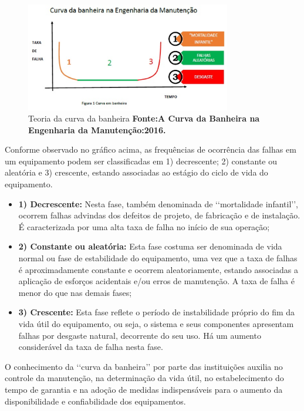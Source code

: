 \graphicspath{{figuras/}}
\begin{figure}[H]
\centering
\includegraphics[width=0.8\textwidth]{curva_da_banheira.eps}
\caption{Teoria da curva da banheira \textbf{Fonte:A Curva da Banheira na Engenharia da Manutenção:2016.}}
\label{Curva da banheira}
\end{figure}

Conforme observado no gráfico acima, as frequências de ocorrência das falhas em um equipamento podem ser classificadas em 1) decrescente; 2) constante ou aleatória e 3) crescente, estando associadas ao estágio do ciclo de vida do equipamento.

\begin{itemize}
	\item \textbf{1) Decrescente:} Nesta fase, também denominada de \lq\lq mortalidade infantil\rq\rq, ocorrem falhas advindas dos defeitos de projeto, de fabricação e de instalação. É caracterizada por uma alta taxa de falha no início de sua operação;
	\item \textbf{2) Constante ou aleatória:} Esta fase costuma ser denominada de vida normal ou fase de estabilidade do equipamento, uma vez que a taxa de falhas é aproximadamente constante e ocorrem aleatoriamente, estando associadas a aplicação de esforços acidentais e/ou erros de manutenção. A taxa de falha é menor do que nas demais fases;
	\item \textbf{3) Crescente:} Esta fase reflete o período de instabilidade próprio do fim da vida útil do equipamento, ou seja, o sistema e seus componentes apresentam falhas por desgaste natural, decorrente do seu uso. Há um aumento considerável da taxa de falha nesta fase.  
\end{itemize} 

O conhecimento da {\lq\lq curva da banheira\rq\rq} por parte das instituições auxilia no controle da manutenção, na determinação da vida útil, no estabelecimento do tempo de garantia e na adoção de medidas indispensáveis para o aumento da disponibilidade e confiabilidade dos equipamentos.

